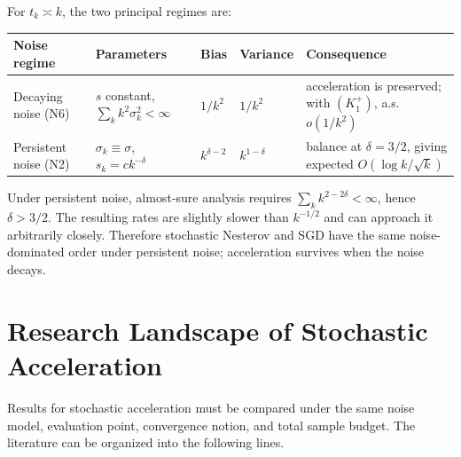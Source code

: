 \documentclass[11pt]{article}
\begin{document}
For $t_k\asymp k$, the two principal regimes are:
\begin{center}
\small
\begin{tabularx}{\linewidth}{@{}lYllY@{}}
\toprule
Noise regime & Parameters & Bias & Variance & Consequence \\
\midrule
Decaying noise (N6) & $s$ constant, $\sum_k k^2\sigma_k^2<\infty$ & $1/k^2$ & $1/k^2$ & acceleration is preserved; with $(K_1^+)$, a.s.\ $o(1/k^2)$ \\
Persistent noise (N2) & $\sigma_k\equiv\sigma$, $s_k=c k^{-\delta}$ & $k^{\delta-2}$ & $k^{1-\delta}$ & balance at $\delta=3/2$, giving expected $O(\log k/\sqrt{k})$ \\
\bottomrule
\end{tabularx}
\end{center}

Under persistent noise, almost-sure analysis requires
$\sum_k k^{2-2\delta}<\infty$, hence $\delta>3/2$. The resulting rates are slightly slower than $k^{-1/2}$ and can approach it arbitrarily closely. Therefore stochastic Nesterov and SGD have the same noise-dominated order under persistent noise; acceleration survives when the noise decays.

\section{Research Landscape of Stochastic Acceleration}

Results for stochastic acceleration must be compared under the same noise model, evaluation point, convergence notion, and total sample budget. The literature can be organized into the following lines.
\end{document}
